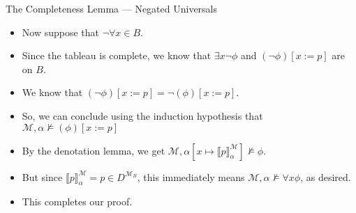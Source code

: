 \begin{frame}{The Completeness Lemma --- Negated Universals}

  \begin{itemize}

  \item Now suppose that $\neg\forall x\in B$.

    \item Since the tableau is complete, we know that $\exists
      x\neg\phi$ and $(\neg \phi)[x:=p]$ are on $B$.

    \item We know that $(\neg \phi)[x:=p]=\neg (\phi)[x:=p]$.

      \item So, we can conclude using the induction hypothesis that $\mathcal{M}, \alpha\nvDash
        (\phi)[x:=p]$

        \item By the denotation lemma, we get
          $\mathcal{M},\alpha[x\mapsto \llbracket
          p\rrbracket^\mathcal{M}_\alpha]\nvDash \phi$.

          \item But since $\llbracket
            p\rrbracket^\mathcal{M}_\alpha=p\in D^{\mathcal{M}_B}$,
            this immediately means $\mathcal{M},\alpha\nvDash \forall
            x\phi$, as desired.

            \item This completes our proof. 
    
  \end{itemize}
  
\end{frame}


